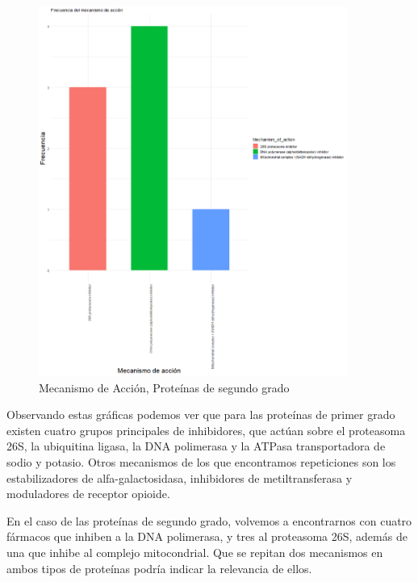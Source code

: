 \begin{figure}[h!]
			\includegraphics[width=0.9\textwidth]{figures/graficaMecanismoDeAccion.png}
			\caption{Mecanismo de Acción, Proteínas de segundo grado}
\end{figure}



Observando estas gráficas podemos ver que para las proteínas de primer grado existen cuatro grupos principales de inhibidores, que actúan sobre el proteasoma 26S, la ubiquitina ligasa, la DNA polimerasa y la ATPasa transportadora de sodio y potasio. Otros mecanismos de los que encontramos repeticiones son los estabilizadores de alfa-galactosidasa, inhibidores de metiltransferasa y moduladores de receptor opioide.

En el caso de las proteínas de segundo grado, volvemos a encontrarnos con cuatro fármacos que inhiben a la DNA polimerasa, y tres al proteasoma 26S, además de una que inhibe al complejo mitocondrial. Que se repitan dos mecanismos en ambos tipos de proteínas podría indicar la relevancia de ellos.

